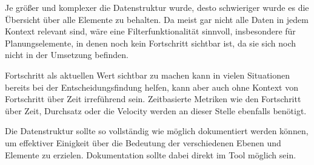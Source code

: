 Je größer und komplexer die Datenstruktur wurde, desto schwieriger wurde es die Übersicht über alle Elemente zu behalten. Da meist gar nicht alle Daten in jedem Kontext relevant sind, wäre eine Filterfunktionalität sinnvoll, insbesondere für Planungselemente, in denen noch kein Fortschritt sichtbar ist, da sie sich noch nicht in der Umsetzung befinden.

Fortschritt als aktuellen Wert sichtbar zu machen kann in vielen Situationen bereits bei der Entscheidungsfindung helfen, kann aber auch ohne Kontext von Fortschritt über Zeit irreführend sein. Zeitbasierte Metriken wie den Fortschritt über Zeit, Durchsatz oder die Velocity werden an dieser Stelle ebenfalls benötigt.

Die Datenstruktur sollte so vollständig wie möglich dokumentiert werden können, um effektiver Einigkeit über die Bedeutung der verschiedenen Ebenen und Elemente zu erzielen. Dokumentation sollte dabei direkt im Tool möglich sein.